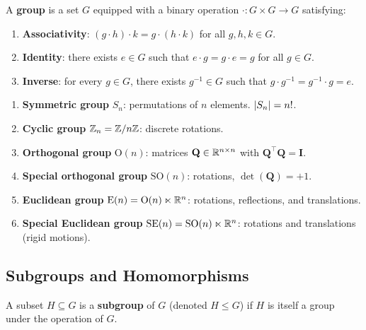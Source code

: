 \begin{definition}[Group]
A \textbf{group} is a set $G$ equipped with a binary operation
$\cdot: G \times G \to G$ satisfying:
\begin{enumerate}
    \item \textbf{Associativity}: $(g \cdot h) \cdot k = g \cdot (h \cdot k)$
          for all $g, h, k \in G$.
    \item \textbf{Identity}: there exists $e \in G$ such that
          $e \cdot g = g \cdot e = g$ for all $g \in G$.
    \item \textbf{Inverse}: for every $g \in G$, there exists $g^{-1} \in G$ such
          that $g \cdot g^{-1} = g^{-1} \cdot g = e$.
\end{enumerate}
\end{definition}

\begin{example}
\begin{enumerate}
    \item \textbf{Symmetric group} $S_n$: permutations of $n$ elements.
          $\left| S_n \right| = n!$.
    \item \textbf{Cyclic group} $\mathbb{Z}_n = \mathbb{Z}/n\mathbb{Z}$: discrete rotations.
    \item \textbf{Orthogonal group} $\mathrm{O}(n)$: matrices $\mathbf{Q} \in \mathbb{R}^{n \times n}$
          with $\mathbf{Q}^\top\mathbf{Q} = \mathbf{I}$.
    \item \textbf{Special orthogonal group} $\mathrm{SO}(n)$: rotations,
          $\det(\mathbf{Q}) = +1$.
    \item \textbf{Euclidean group} $\mathrm{E}(n) = \mathrm{O}(n) \ltimes \mathbb{R}^n$:
          rotations, reflections, and translations.
    \item \textbf{Special Euclidean group} $\mathrm{SE}(n) = \mathrm{SO}(n) \ltimes \mathbb{R}^n$:
          rotations and translations (rigid motions).
\end{enumerate}
\end{example}

\subsection{Subgroups and Homomorphisms}

\begin{definition}[Subgroup]
A subset $H \subseteq G$ is a \textbf{subgroup} of $G$ (denoted $H \leq G$) if
$H$ is itself a group under the operation of $G$.
\end{definition}

